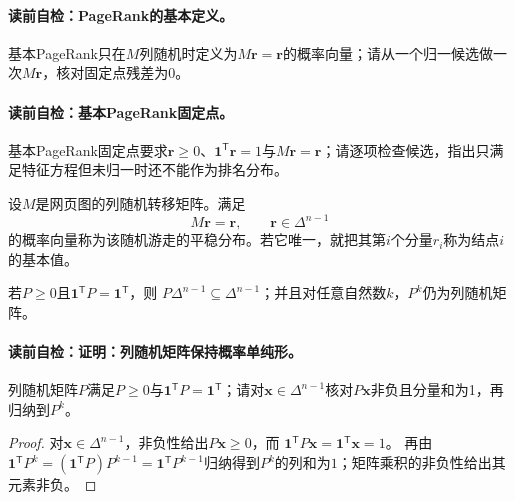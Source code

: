 \paragraph{读前自检：PageRank的基本定义。}基本PageRank只在$M$列随机时定义为$M\boldsymbol r=\boldsymbol r$的概率向量；请从一个归一候选做一次$M\boldsymbol r$，核对固定点残差为0。\par
\paragraph{读前自检：基本PageRank固定点。}基本PageRank固定点要求$\boldsymbol r\ge0$、$\boldsymbol1^{\mathsf T}\boldsymbol r=1$与$M\boldsymbol r=\boldsymbol r$；请逐项检查候选，指出只满足特征方程但未归一时还不能作为排名分布。\par


\begin{definition}[基本\PageRank{}]\label{def:V5-C07-basic}
设$M$是网页图的列随机转移矩阵。满足
\begin{equation}
M\boldsymbol r=\boldsymbol r,\qquad
\boldsymbol r\in\Delta^{n-1}
\label{eq:V5-C07-basic-fixed}
\end{equation}
的概率向量称为该随机游走的平稳分布。若它唯一，就把其第$i$个分量$r_i$称为结点$i$的基本\PageRank{}值。
\end{definition}

\begin{proposition}[列随机矩阵保持概率单纯形]\label{prop:V5-C07-simplex-invariance}
若$P\ge0$且$\boldsymbol1^{\mathsf T}P=\boldsymbol1^{\mathsf T}$，则
$P\Delta^{n-1}\subseteq\Delta^{n-1}$；并且对任意自然数$k$，$P^k$仍为列随机矩阵。
\end{proposition}
\paragraph{读前自检：证明：列随机矩阵保持概率单纯形。}列随机矩阵$P$满足$P\ge0$与$\boldsymbol1^{\mathsf T}P=\boldsymbol1^{\mathsf T}$；请对$\boldsymbol x\in\Delta^{n-1}$核对$P\boldsymbol x$非负且分量和为1，再归纳到$P^k$。\par

\begin{proof}
对$\boldsymbol x\in\Delta^{n-1}$，非负性给出$P\boldsymbol x\ge0$，而
$\boldsymbol1^{\mathsf T}P\boldsymbol x=\boldsymbol1^{\mathsf T}\boldsymbol x=1$。
再由$\boldsymbol1^{\mathsf T}P^k=(\boldsymbol1^{\mathsf T}P)P^{k-1}
=\boldsymbol1^{\mathsf T}P^{k-1}$归纳得到$P^k$的列和为$1$；矩阵乘积的非负性给出其元素非负。
\end{proof}

